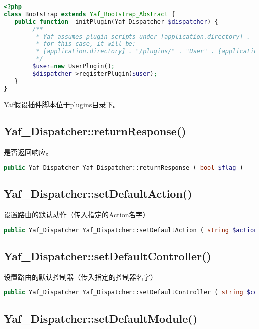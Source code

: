 \begin{lstlisting}[language=PHP]
<?php
class Bootstrap extends Yaf_Bootstrap_Abstract {
   public function _initPlugin(Yaf_Dispatcher $dispatcher) {
        /**
         * Yaf assumes plugin scripts under [application.directory] .  "/plugins" 
         * for this case, it will be:
         * [application.directory] . "/plugins/" . "User" . [application.ext]
         */ 
        $user=new UserPlugin();
        $dispatcher->registerPlugin($user);
   }
}
\end{lstlisting}

Yaf假设插件脚本位于plugins目录下。




\subsection{Yaf\_Dispatcher::returnResponse()}

是否返回响应。

\begin{lstlisting}[language=PHP]
public Yaf_Dispatcher Yaf_Dispatcher::returnResponse ( bool $flag )
\end{lstlisting}

\subsection{Yaf\_Dispatcher::setDefaultAction()}

设置路由的默认动作（传入指定的Action名字）

\begin{lstlisting}[language=PHP]
public Yaf_Dispatcher Yaf_Dispatcher::setDefaultAction ( string $action )
\end{lstlisting}


\subsection{Yaf\_Dispatcher::setDefaultController()}

设置路由的默认控制器（传入指定的控制器名字）

\begin{lstlisting}[language=PHP]
public Yaf_Dispatcher Yaf_Dispatcher::setDefaultController ( string $controller )
\end{lstlisting}

\subsection{Yaf\_Dispatcher::setDefaultModule()}

